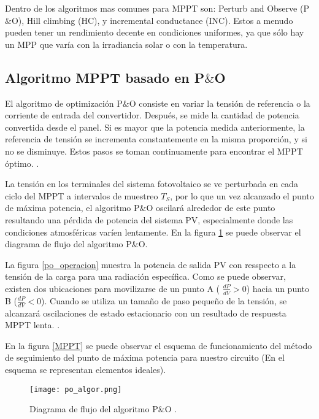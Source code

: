 \documentclass[10pt,twocolumn]{article}
\begin{document}
Dentro de los algoritmos mas comunes para MPPT son: Perturb and Observe (P$\&$O), Hill climbing (HC), y incremental conductance (INC). Estos a menudo pueden tener un rendimiento decente en condiciones uniformes, ya que sólo hay un MPP que varía con la irradiancia solar o con la temperatura.

\subsection{Algoritmo MPPT basado en P$\&$O}

El algoritmo de optimización P$\&$O consiste en variar la tensión de referencia o la corriente de entrada del convertidor. Después, se mide la cantidad de potencia convertida desde el panel. Si es mayor que la potencia medida anteriormente, la referencia de tensión se incrementa constantemente en la misma proporción, y si no se disminuye. Estos pasos se toman continuamente para encontrar el MPPT óptimo. \cite{tobon2017maximum}.

La tensión en los terminales del sistema fotovoltaico se ve perturbada en cada ciclo del MPPT a intervalos de muestreo $T_S$, por lo que un vez alcanzado el punto de máxima potencia, el algoritmo P$\&$O oscilará alrededor de este punto resultando una pérdida de potencia del sistema PV, especialmente donde las condiciones atmosféricas varíen lentamente. En la figura \ref{po_algor} se puede observar el diagrama de flujo del algoritmo P$\&$O. \cite{molina2007analisis}

La figura \ref{po_operacion} muestra la potencia de salida PV con resspecto a la tensión de la carga para una radiación específica. Como se puede observar, existen dos ubicaciones para movilizarse de un punto A ( $\frac{dP}{dV} > 0$) hacia un punto B ($\frac{dP}{dV} < 0$). Cuando se utiliza un tamaño de
paso pequeño de la tensión, se alcanzará oscilaciones de estado estacionario con un resultado de respuesta MPPT
lenta. \cite{abdelwahab2020comparative}.

En la figura \ref{MPPT} se puede observar el esquema de funcionamiento del método de seguimiento del punto de máxima potencia para nuestro circuito (En el esquema se representan elementos ideales).

 \begin{figure}[h!]
	\centering
	\texttt{[image: po\_algor.png]}
	\caption{Diagrama de flujo del algoritmo P$\&$O \cite{molina2007analisis}.}
	\label{po_algor}
\end{figure}
\end{document}
